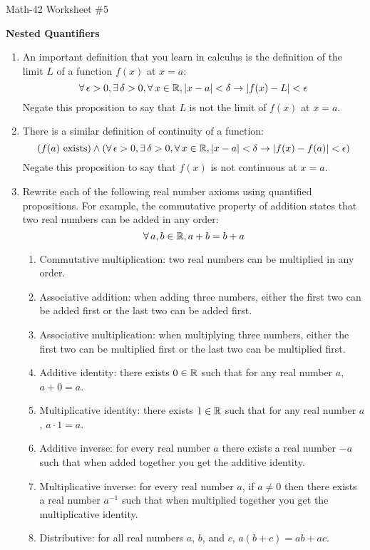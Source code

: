 \documentclass[letterpaper,12pt,fleqn]{article}
\renewcommand{\implies}{\rightarrow}
\newcommand{\e}{\epsilon}
\renewcommand{\d}{\delta}
\begin{document}
\begin{center}
  \large Math-42 Worksheet \#5

  \textbf{Nested Quantifiers}
\end{center}

\vspace{0.5in}

\begin{enumerate}[left=0in,itemsep=0.5in]
\item An important definition that you learn in calculus is the definition of the limit \(L\) of a function
  \(f(x)\) at \(x=a\):
  \[\forall\,\e>0,\exists\,\d>0,\forall\,x\in\R,\abs{x-a}<\d\implies\abs{f(x)-L}<\e\]
  Negate this proposition to say that \(L\) is not the limit of \(f(x)\) at \(x=a\).

\item There is a similar definition of continuity of a function:
  \[(f(a)\ \text{exists})\land(\forall\,\e>0,\exists\,\d>0,\forall\,x\in\R,\abs{x-a}<\d\implies\abs{f(x)-f(a)}<\e)\]
  Negate this proposition to say that \(f(x)\) is not continuous at \(x=a\).

\item Rewrite each of the following real number axioms using quantified propositions.  For example, the
  commutative property of addition states that two real numbers can be added in any order:
  \[\forall\,a,b\in\mathbb{R},a+b=b+a\]
  \begin{enumerate}
  \item Commutative multiplication: two real numbers can be multiplied in any order.
  \item Associative addition: when adding three numbers, either the first two can be added first or the last two
    can be added first.
  \item Associative multiplication: when multiplying three numbers, either the first two can be multiplied first or
    the last two can be multiplied first.
  \item Additive identity: there exists \(0\in\mathbb{R}\) such that for any real number \(a\), \(a+0=a\).
  \item Multiplicative identity: there exists \(1\in\mathbb{R}\) such that for any real number \(a\), \(a\cdot1=a\).
  \item Additive inverse: for every real number \(a\) there exists a real number \(-a\) such that when added
    together you get the additive identity.
  \item Multiplicative inverse: for every real number \(a\), if \(a\ne0\) then there exists a real number \(a^{-1}\)
    such that when multiplied together you get the multiplicative identity.
  \item Distributive: for all real numbers \(a\), \(b\), and \(c\), \(a(b+c)=ab+ac\).
  \end{enumerate}


\end{enumerate}
\end{document}
